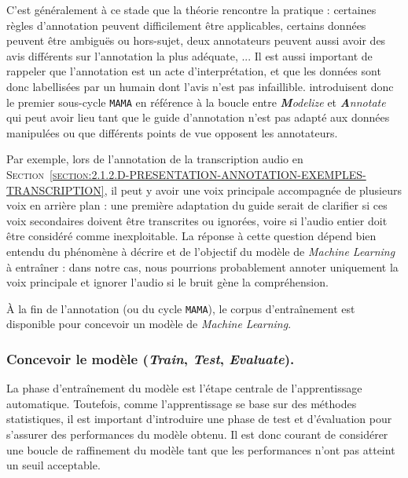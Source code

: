 			\begin{leftBarInformation}
				C'est généralement à ce stade que la théorie rencontre la pratique : certaines règles d'annotation peuvent difficilement être applicables, certains données peuvent être ambiguës ou hors-sujet, deux annotateurs peuvent aussi avoir des avis différents sur l'annotation la plus adéquate, ...
				Il est aussi important de rappeler que l'annotation est un acte d'interprétation, et que les données sont donc labellisées par un humain dont l'avis n'est pas infaillible. 
				\cite{pustejovsky-stubbs:2012:natural-language-annotation} introduisent donc le premier sous-cycle \texttt{MAMA} en référence à la boucle entre \textit{\textbf{M}odelize} et \textit{\textbf{A}nnotate} qui peut avoir lieu tant que le guide d'annotation n'est pas adapté aux données manipulées ou que différents points de vue opposent les annotateurs.
				
				Par exemple, lors de l'annotation de la transcription audio en \textsc{Section~\ref{section:2.1.2.D-PRESENTATION-ANNOTATION-EXEMPLES-TRANSCRIPTION}}, il peut y avoir une voix principale accompagnée de plusieurs voix en arrière plan : une première adaptation du guide serait de clarifier si ces voix secondaires doivent être transcrites ou ignorées, voire si l'audio entier doit être considéré comme inexploitable.
				La réponse à cette question dépend bien entendu du phénomène à décrire et de l'objectif du modèle de \textit{Machine Learning} à entraîner : dans notre cas, nous pourrions probablement annoter uniquement la voix principale et ignorer l'audio si le bruit gène la compréhension.
			\end{leftBarInformation}
			
			À la fin de l'annotation (ou du cycle \texttt{MAMA}), le corpus d'entraînement est disponible pour concevoir un modèle de \textit{Machine Learning}.
		
		
		\subsubsection{Concevoir le modèle (\textit{\textbf{T}rain}, \textit{\textbf{T}est}, \textit{\textbf{E}valuate}).}
		\label{section:2.2.1.B-ORGANISATION-ANNOTATION-ETAPES-CLES-TRAIN-TEST}
			
			La phase d'entraînement du modèle est l'étape centrale de l'apprentissage automatique.
			Toutefois, comme l'apprentissage se base sur des méthodes statistiques, il est important d'introduire une phase de test et d'évaluation pour s'assurer des performances du modèle obtenu.
			Il est donc courant de considérer une boucle de raffinement du modèle tant que les performances n'ont pas atteint un seuil acceptable.
			
